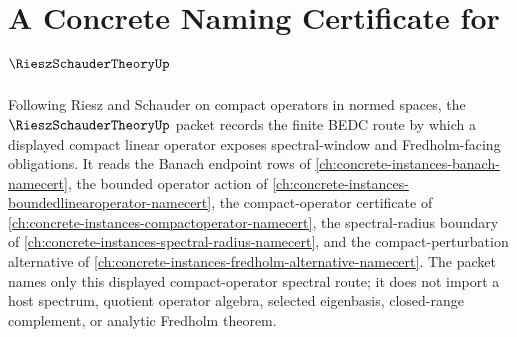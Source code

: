 \chapter{A Concrete Naming Certificate for $\RieszSchauderTheoryUp$}
\label{ch:concrete-instances-riesz-schauder-theory-namecert}

Following Riesz and Schauder on compact operators in normed spaces, the $\RieszSchauderTheoryUp$ packet records the finite BEDC route by which a displayed compact linear operator exposes spectral-window and Fredholm-facing obligations. It reads the Banach endpoint rows of \autoref{ch:concrete-instances-banach-namecert}, the bounded operator action of \autoref{ch:concrete-instances-boundedlinearoperator-namecert}, the compact-operator certificate of \autoref{ch:concrete-instances-compactoperator-namecert}, the spectral-radius boundary of \autoref{ch:concrete-instances-spectral-radius-namecert}, and the compact-perturbation alternative of \autoref{ch:concrete-instances-fredholm-alternative-namecert}. The packet names only this displayed compact-operator spectral route; it does not import a host spectrum, quotient operator algebra, selected eigenbasis, closed-range complement, or analytic Fredholm theorem.

